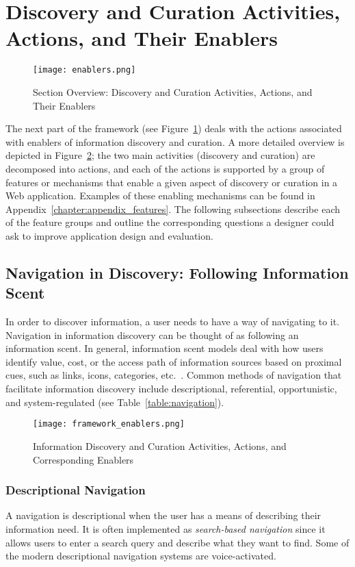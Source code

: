 {\section{Discovery and Curation Activities, Actions, and Their Enablers}
\label{section:enablers}

\begin{figure}[ht!]
	\noindent
	\centering
	\texttt{[image: enablers.png]}
	\caption{Section Overview: Discovery and Curation Activities, Actions, and Their Enablers}
	\label{fig:enablers_overview} 
\end{figure}
The next part of the framework (see Figure~\ref{fig:enablers_overview}) deals with the actions associated with enablers of information discovery and curation. A more detailed overview is depicted in Figure~\ref{fig:enablers}; the two main activities (discovery and curation) are decomposed into actions, and each of the actions is supported by a group of features or mechanisms that enable a given aspect of discovery or curation in a Web application. Examples of these enabling mechanisms can be found in Appendix~\ref{chapter:appendix_features}. The following subsections describe each of the feature groups and outline the corresponding questions a designer could ask to improve application design and evaluation.  

{\subsection{Navigation in Discovery: Following Information Scent}
In order to discover information, a user needs to have a way of navigating to it. Navigation in information discovery can be thought of as following an information scent. In general, information scent models deal with how users identify value, cost, or the access path of information sources based on proximal cues, such as links, icons, categories, etc.~\cite{pirolli1999information}. Common methods of navigation that facilitate information discovery include descriptional, referential, opportunistic, and system-regulated (see Table~\ref{table:navigation}). 

\begin{figure}[ht!]
	\noindent
	\centering
	\texttt{[image: framework\_enablers.png]}
	\caption{Information Discovery and Curation Activities, Actions, and Corresponding Enablers}
	\label{fig:enablers} 
\end{figure}
\clearpage

{\subsubsection{Descriptional Navigation}
A navigation is descriptional when the user has a means of describing their information need. It is often implemented as \textit{search-based navigation} since it allows users to enter a search query and describe what they want to find. Some of the modern descriptional navigation systems are voice-activated. 

}}}

